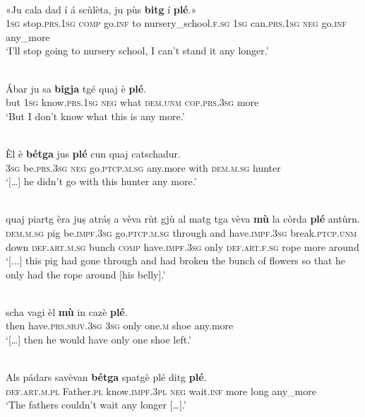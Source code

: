 \ea
\label{}
\\
\gll  «Ju cala dad í á scùlèta, ju pùs \textbf{bitg} í \textbf{plé}.»\\
\textsc{1sg} stop.\textsc{prs.1sg} \textsc{comp} go.\textsc{inf} to nursery\_school.\textsc{f.sg} \textsc{1sg} can.\textsc{prs.1sg} \textsc{neg} go.\textsc{inf} any\_more  \\
\glt `I’ll stop going to nursery school, I can’t stand it any longer.'
\z

\ea
\label{}
\\
\gll Ábar ju sa \textbf{bigja} tgé quaj è \textbf{plé}.\\
but \textsc{1sg} know.\textsc{prs.1sg} \textsc{neg} what \textsc{dem.unm} \textsc{cop.prs.3sg} more\\
\glt `But I don't know what this is any more.'
\z

\ea
\label{}
 {\citealt[12]{Büchli1966}}\\
\gll   Èl è \textbf{bétga} jus \textbf{plé} cun quaj catschadur. \\
      \textsc{3sg} be.\textsc{prs.3sg} \textsc{neg} go.\textsc{ptcp.m.sg} any.more with \textsc{dem.m.sg} hunter\\
\glt `[…] he didn’t go with this hunter any more.'
\z

\ea
\label{}
\\
	\gll    [..] quaj piartg èra juṣ atráṣ a vèva rùt gjù al matg tga vèva \textbf{mù} la còrda \textbf{plé} antùrn.\\
{} \textsc{dem.m.sg} pig be.\textsc{impf.3sg} go.\textsc{ptcp.m.sg} through and have.\textsc{impf.3sg} break.\textsc{ptcp.unm} down \textsc{def.art.m.sg} bunch  \textsc{comp} have.\textsc{impf.3sg} only \textsc{def.art.f.sg} rope more around\\
\glt `[...] this pig had gone through and had broken the bunch of flowers so that he only had the rope around [his belly].'
\z


\ea\label{}
 {\citealt[15]{Büchli1966}}\\
\gll  [...] scha vagi èl \textbf{mù} in cazè \textbf{plé}.\\
     then have.\textsc{prs.sbjv.3sg} \textsc{3sg} only one.\textsc{m} shoe any.more \\
\glt `[…] then he would have only one shoe left.'
\z

\ea
\label{}
 {\citealt[147]{Büchli1966}}\\
\gll    Als pádars savèvan \textbf{bétga} spatgè plé ditg \textbf{plé}.\\
      \textsc{def.art.m.pl} Father.\textsc{pl} know.\textsc{impf.3pl} \textsc{neg} wait.\textsc{inf} more long any\_more\\
\glt `The fathers couldn’t wait any longer […].'
\z


